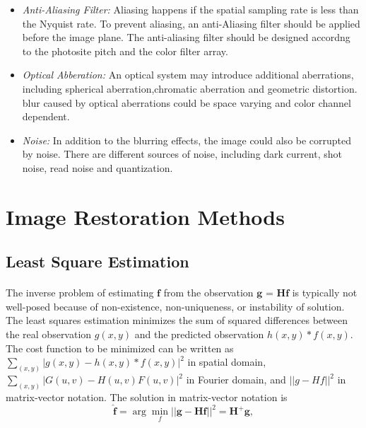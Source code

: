 \documentclass[a4paper]{book}
\begin{document}
\begin{itemize}
		\item \textit{Anti-Aliasing Filter:} Aliasing happens if the spatial sampling rate is less than the Nyquist rate. To prevent aliasing, an anti-Aliasing filter should be applied before the image plane. The anti-aliasing filter should be designed accordng to the photosite pitch and the color filter array.
		\item \textit{Optical Abberation:} An optical system may introduce additional aberrations, including spherical aberration,chromatic aberration and geometric distortion. blur caused by optical aberrations could be space varying and color channel dependent.
		\item \textit{Noise:} In addition to the blurring effects, the image could also be corrupted by noise. There are different sources of noise, including dark current, shot noise, read noise and quantization.
	\end{itemize}
	

	\section{\Large Image Restoration Methods}
	
	\subsection{Least Square Estimation}
	\paragraph*{}The inverse problem of estimating $ \textbf{f} $ from the observation $ \textbf{g = Hf} $ is typically not well-posed because of non-existence, non-uniqueness, or instability of solution. The least squares estimation minimizes the sum of squared differences between the real observation $ g(x,y) $ and the predicted observation $ h(x,y) \ast f(x,y) $. The cost function to be minimized can be written as $ \sum_{(x,y)} |g(x,y)-h(x,y)\ast f(x,y)|^{2}$ in spatial domain, $ \sum_{(x,y)} |G(u,v)-H(u,v)F(u,v)|^{2} $ in Fourier domain, and $ ||g - Hf||^{2} $ in matrix-vector notation. The solution in matrix-vector notation is 
\begin{equation}
\label{eq3.4}
\hat{\textbf{f}} = \arg\min_{f} ||\textbf{g} - \textbf{Hf}||^{2} = \textbf{H}^{+}\textbf{g},
\end{equation}
\end{document}
